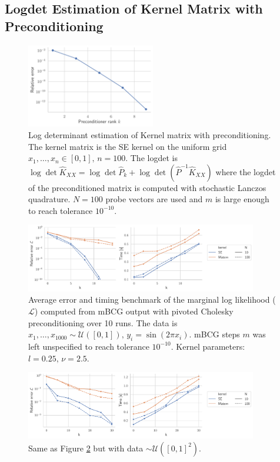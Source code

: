 \documentclass{article}
\begin{document}
\subsection{Logdet Estimation of Kernel Matrix with Preconditioning}

\begin{figure}
    \centering
    \includegraphics[width=0.5\textwidth]{res/logdet_precond_errvsk.pdf}
    \caption{Log determinant estimation of Kernel matrix with preconditioning. The kernel matrix is the SE kernel on the uniform grid $x_1, \ldots, x_n \in [0, 1], \, n=100$. The logdet is $\log\det \widehat K_{XX} = \log\det \widehat P_k + \log\det(\widehat P^{-1} \widehat K_{XX})$ where the logdet of the preconditioned matrix is computed with stochastic Lanczos quadrature. $N=100$ probe vectors are used and $m$ is large enough to reach tolerance $10^{-10}$.}
    \label{fig:my_label}
\end{figure}


\begin{figure}
    \centering
    \includegraphics[width=0.9\textwidth]{report/res/likelihood.pdf}
    \caption{Average error and timing benchmark of the marginal log likelihood ($\mathcal L$) computed from mBCG output with pivoted Cholesky preconditioning over 10 runs. The data is $x_1, \ldots, x_{1000} \sim \mathcal U([0, 1]), \, y_i = \sin(2\pi x_i)$. mBCG steps $m$ was left unspecified to reach tolerance $10^{-10}$. Kernel parameters: $l = 0.25, \, \nu = 2.5$.}
    \label{fig:likelihood}
\end{figure}

\begin{figure}
    \centering
    \includegraphics[width=0.9\textwidth]{report/res/likelihood_2d_unif.pdf}
    \caption{Same as Figure \ref{fig:likelihood} but with data $\sim \mathcal U([0,1]^2)$.}
    \label{fig:likelihood_2d_unif}
\end{figure}
\end{document}
